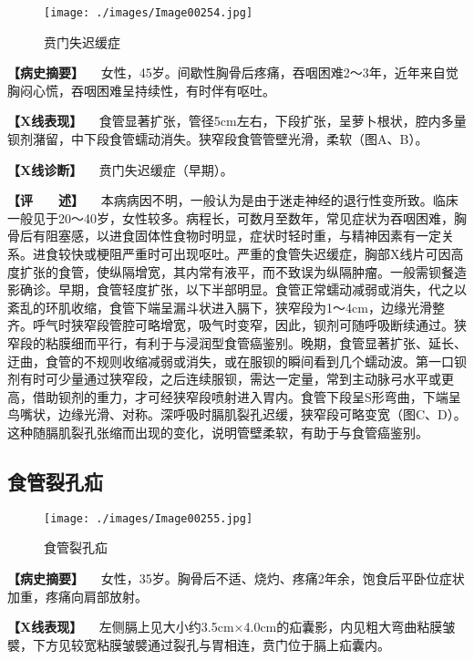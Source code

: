 \begin{figure}[!htbp]
 \centering
 \texttt{[image: ./images/Image00254.jpg]}
 \captionsetup{justification=centering}
 \caption{贲门失迟缓症}
 \label{fig5-2-11}
  \end{figure} 

\textbf{【病史摘要】}
　女性，45岁。间歇性胸骨后疼痛，吞咽困难2～3年，近年来自觉胸闷心慌，吞咽困难呈持续性，有时伴有呕吐。

\textbf{【X线表现】}
　食管显著扩张，管径5cm左右，下段扩张，呈萝卜根状，腔内多量钡剂潴留，中下段食管蠕动消失。狭窄段食管管壁光滑，柔软（图A、B）。

\textbf{【X线诊断】} 　贲门失迟缓症（早期）。

\textbf{【评　　述】}
　本病病因不明，一般认为是由于迷走神经的退行性变所致。临床一般见于20～40岁，女性较多。病程长，可数月至数年，常见症状为吞咽困难，胸骨后有阻塞感，以进食固体性食物时明显，症状时轻时重，与精神因素有一定关系。进食较快或梗阻严重时可出现呕吐。严重的食管失迟缓症，胸部X线片可因高度扩张的食管，使纵隔增宽，其内常有液平，而不致误为纵隔肿瘤。一般需钡餐造影确诊。早期，食管轻度扩张，以下半部明显。食管正常蠕动减弱或消失，代之以紊乱的环肌收缩，食管下端呈漏斗状进入膈下，狭窄段为1～4cm，边缘光滑整齐。呼气时狭窄段管腔可略增宽，吸气时变窄，因此，钡剂可随呼吸断续通过。狭窄段的粘膜细而平行，有利于与浸润型食管癌鉴别。晚期，食管显著扩张、延长、迂曲，食管的不规则收缩减弱或消失，或在服钡的瞬间看到几个蠕动波。第一口钡剂有时可少量通过狭窄段，之后连续服钡，需达一定量，常到主动脉弓水平或更高，借助钡剂的重力，才可经狭窄段喷射进入胃内。食管下段呈S形弯曲，下端呈鸟嘴状，边缘光滑、对称。深呼吸时膈肌裂孔迟缓，狭窄段可略变宽（图C、D）。这种随膈肌裂孔张缩而出现的变化，说明管壁柔软，有助于与食管癌鉴别。

\subsection{食管裂孔疝}

\begin{figure}[!htbp]
 \centering
 \texttt{[image: ./images/Image00255.jpg]}
 \captionsetup{justification=centering}
 \caption{食管裂孔疝}
 \label{fig5-2-12}
  \end{figure} 

\textbf{【病史摘要】}
　女性，35岁。胸骨后不适、烧灼、疼痛2年余，饱食后平卧位症状加重，疼痛向肩部放射。

\textbf{【X线表现】}
　左侧膈上见大小约3.5cm×4.0cm的疝囊影，内见粗大弯曲粘膜皱襞，下方见较宽粘膜皱襞通过裂孔与胃相连，贲门位于膈上疝囊内。

